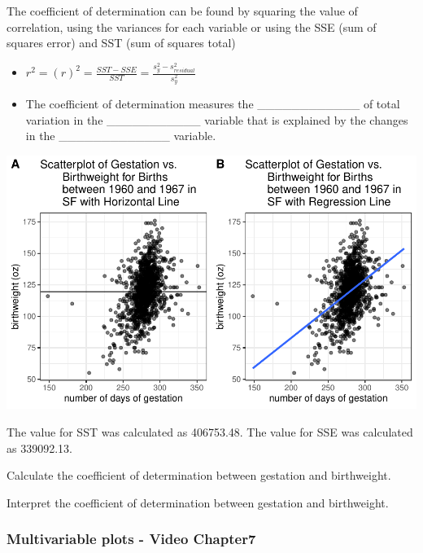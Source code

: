 \documentclass[
]{report}
\begin{document}
The coefficient of determination can be found by squaring the value of correlation, using the variances for each variable or using the SSE (sum of squares error) and SST (sum of squares total)

\begin{itemize}
\item
  \(r^2 = (r)^2 = \frac{SST - SSE}{SST} = \frac{s^2_y - s^2_{residual}}{s^2_y}\)
\item
  The coefficient of determination measures the \_\_\_\_\_\_\_\_\_\_\_\_ of total variation in the \_\_\_\_\_\_\_\_\_\_\_ variable that is explained by the changes in the \_\_\_\_\_\_\_\_\_\_\_\_\_ variable.
\end{itemize}


\begin{center}\includegraphics[width=0.7\linewidth]{13-VN13-regression_files/figure-latex/unnamed-chunk-6-1} \end{center}

The value for SST was calculated as 406753.48. The value for SSE was calculated as 339092.13.

Calculate the coefficient of determination between gestation and birthweight.

\vspace{0.3in}

Interpret the coefficient of determination between gestation and birthweight.

\vspace{0.5in}

\newpage

\subsubsection*{Multivariable plots - Video Chapter7}\label{multivariable-plots---video-chapter7}
\end{document}
